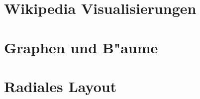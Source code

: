 
\section{Wikipedia Visualisierungen}
\section{Graphen und B"aume}
\section{Radiales Layout}









